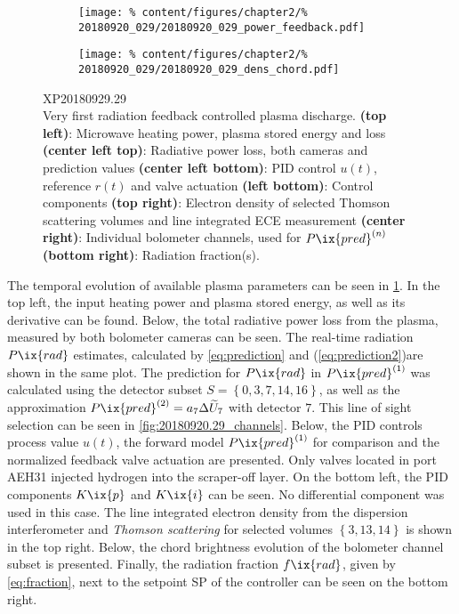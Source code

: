 %
            \begin{figure}[t]%
                \centering%
                \begin{subfigure}{0.49\textwidth}%
                    \texttt{[image: \%
                        content/figures/chapter2/\%
                        20180920\_029/20180920\_029\_power\_feedback.pdf]}%
                \end{subfigure}
                \begin{subfigure}{0.49\textwidth}%
                    \texttt{[image: \%
                        content/figures/chapter2/\%
                        20180920\_029/20180920\_029\_dens\_chord.pdf]}%
                \end{subfigure}%
                \caption{%
                    XP20180929.29\\%
                    Very first radiation feedback controlled plasma discharge. \textbf{(top left)}: Microwave heating power, plasma stored energy and loss \textbf{(center left top)}: Radiative power loss, both cameras and prediction values \textbf{(center left bottom)}: PID control $u\left(t\right)$, reference $r\left(t\right)$ and valve actuation \textbf{(left bottom)}: Control components \textbf{(top right)}: Electron density of selected Thomson scattering volumes and line integrated ECE measurement \textbf{(center right)}: Individual bolometer channels, used for $P\ix{pred}^{\left(n\right)}$ \textbf{(bottom right)}: Radiation fraction(s).}\label{fig:20180920.29_PDF}%
            \end{figure}%
%
            The temporal evolution of available plasma parameters can be seen in \cref{fig:20180920.29_PDF}. In the top left, the input heating power and plasma stored energy, as well as its derivative can be found. Below, the total radiative power loss from the plasma, measured by both bolometer cameras can be seen. The real-time radiation $P\ix{rad}$ estimates, calculated by \cref{eq:prediction} and (\ref{eq:prediction2})are shown in the same plot. The prediction for $P\ix{rad}$ in $P\ix{pred}^{\left(1\right)}$ was calculated using the detector subset $S=\left\{0, 3, 7, 14, 16\right\}$, as well as the approximation $P\ix{pred}^{\left(2\right)}=a_{7}\Delta\widetilde{U}_{7}$ with detector $7$. This line of sight selection can be seen in \cref{fig:20180920.29_channels}. Below, the PID controls process value $u\left(t\right)$, the forward model $P\ix{pred}^{\left(1\right)}$ for comparison and the normalized feedback valve actuation are presented. Only valves located in port AEH31 injected hydrogen into the scraper-off layer. On the bottom left, the PID components $K\ix{p}$ and $K\ix{i}$ can be seen. No differential component was used in this case. The line integrated electron density from the dispersion interferometer and \textit{Thomson scattering} for selected volumes $\left\{3, 13, 14\right\}$ is shown in the top right. Below, the chord brightness evolution of the bolometer channel subset is presented. Finally, the radiation fraction $f\ix{rad}$, given by \cref{eq:fraction}, next to the setpoint SP of the controller can be seen on the bottom right.\\%
